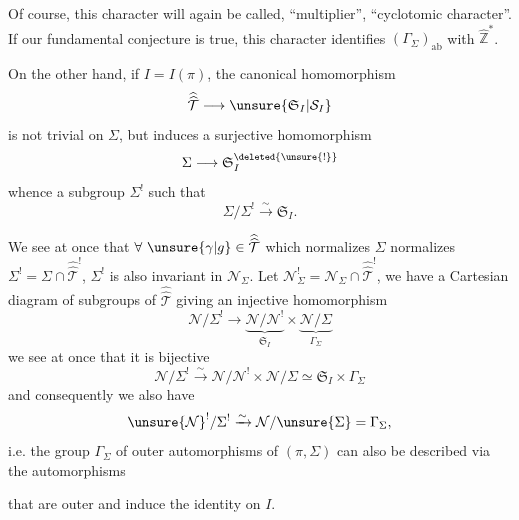 
Of course, this character will again be called, ``multiplier'',  ``cyclotomic character''.  If our fundamental conjecture is true, this character identifies $(\Gamma_\Sigma)_{\mathrm{ab}}$ with $\widehat{\mathbb Z}^{*}$.

On the other hand, if $I=I(\pi)$, the canonical homomorphism
\[
\widehat{\widehat{\mathcal T}}\longrightarrow\unsure{\mathfrak S_I|\mathcal S_I}
\]
is  not trivial on $\Sigma$, but induces a surjective homomorphism
\[
\Sigma\longrightarrow\mathfrak S_I^{\deleted{\unsure{!}}}
\]
whence a subgroup $\Sigma^!$ such that
\[
\Sigma/\Sigma^!\xrightarrow{\sim}\mathfrak S_I.
\]

We see at once that $\forall\ \unsure{\gamma|g}\in\widehat{\widehat{\mathcal T}}$ which normalizes $\Sigma$ normalizes $\Sigma^!=\Sigma\cap\widehat{\widehat{\mathcal T}}^!$,  $\Sigma^!$ is also invariant in $\mathcal N_\Sigma$.  Let $\mathcal N_\Sigma^!=\mathcal N_\Sigma\cap\widehat{\widehat{\mathcal T}}^!$, we have a Cartesian diagram of subgroups of $\widehat{\widehat{\mathcal T}}$
giving an injective homomorphism
\[
\mathcal N/\Sigma^!\longrightarrow
\underbrace{\mathcal N/\mathcal N^!}_{\mathfrak S_I}\times
\underbrace{\mathcal N/\Sigma}_{\Gamma_\Sigma}
\]
 we see at once that it is bijective
\[
\mathcal N/\Sigma^!\xrightarrow{\sim}\mathcal N/\mathcal N^!\times\mathcal N/\Sigma\simeq\mathfrak S_I\times\Gamma_\Sigma
\]
and consequently we also have
\[
\unsure{\mathcal N}^!/\Sigma^!\xrightarrow{\sim}\mathcal N/\unsure{\Sigma}=\Gamma_\Sigma,
\]
i.e. the group $\Gamma_\Sigma$ of  outer automorphisms of $(\pi,\Sigma)$ can also be described via the automorphisms


that are outer and induce the identity on $I$.

